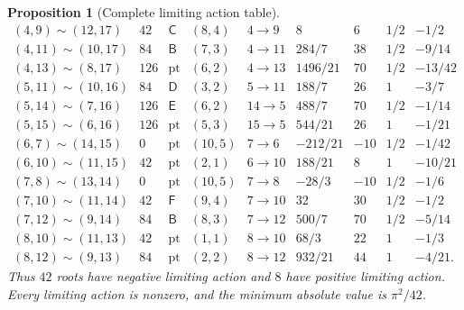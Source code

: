 \documentclass[11pt,reqno]{amsart}
\theoremstyle{plain}
\newtheorem{proposition}[theorem]{Proposition}
\theoremstyle{definition}
\begin{document}
\begin{proposition}[Complete limiting action table]
\[\begin{array}{c|r|c|c|c|r|r|c|r}
(4,9)\sim(12,17)&42&\mathsf C&(8,4)&4\to9&8&6&1/2&-1/2\\
(4,11)\sim(10,17)&84&\mathsf B&(7,3)&4\to11&284/7&38&1/2&-9/14\\
(4,13)\sim(8,17)&126&\mathrm{pt}&(6,2)&4\to13&1496/21&70&1/2&-13/42\\
(5,11)\sim(10,16)&84&\mathsf D&(3,2)&5\to11&188/7&26&1&-3/7\\
(5,14)\sim(7,16)&126&\mathsf E&(6,2)&14\to5&488/7&70&1/2&-1/14\\
(5,15)\sim(6,16)&126&\mathrm{pt}&(5,3)&15\to5&544/21&26&1&-1/21\\
(6,7)\sim(14,15)&0&\mathrm{pt}&(10,5)&7\to6&-212/21&-10&1/2&-1/42\\
(6,10)\sim(11,15)&42&\mathrm{pt}&(2,1)&6\to10&188/21&8&1&-10/21\\
(7,8)\sim(13,14)&0&\mathrm{pt}&(10,5)&7\to8&-28/3&-10&1/2&-1/6\\
(7,10)\sim(11,14)&42&\mathsf F&(9,4)&7\to10&32&30&1/2&-1/2\\
(7,12)\sim(9,14)&84&\mathsf B&(8,3)&7\to12&500/7&70&1/2&-5/14\\
(8,10)\sim(11,13)&42&\mathrm{pt}&(1,1)&8\to10&68/3&22&1&-1/3\\
(8,12)\sim(9,13)&84&\mathrm{pt}&(2,2)&8\to12&932/21&44&1&-4/21.
\end{array}
\]
\endgroup
Thus $42$ roots have negative limiting action and $8$ have positive limiting action.  Every
limiting action is nonzero, and the minimum absolute value is $\pi^2/42$.
\end{proposition}
\end{document}
